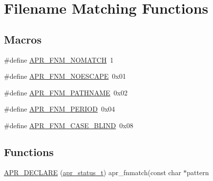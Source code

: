 \hypertarget{group__apr__fnmatch}{}\section{Filename Matching Functions}
\label{group__apr__fnmatch}
\subsection*{Macros}
\begin{DoxyCompactItemize}
\item 
\#define \mbox{\hyperlink{group__apr__fnmatch_gaea769621807400e4c741e7deddf6c3df}{A\+P\+R\+\_\+\+F\+N\+M\+\_\+\+N\+O\+M\+A\+T\+CH}}~1
\item 
\#define \mbox{\hyperlink{group__apr__fnmatch_gae12c1286631f316647be6dc007170630}{A\+P\+R\+\_\+\+F\+N\+M\+\_\+\+N\+O\+E\+S\+C\+A\+PE}}~0x01
\item 
\#define \mbox{\hyperlink{group__apr__fnmatch_ga0d421a2cef68cb590f958b5de6c7fe1b}{A\+P\+R\+\_\+\+F\+N\+M\+\_\+\+P\+A\+T\+H\+N\+A\+ME}}~0x02
\item 
\#define \mbox{\hyperlink{group__apr__fnmatch_ga4806f936b6eacc59dfed831d67b750ef}{A\+P\+R\+\_\+\+F\+N\+M\+\_\+\+P\+E\+R\+I\+OD}}~0x04
\item 
\#define \mbox{\hyperlink{group__apr__fnmatch_ga5cee1c0a917a283a193721d11160b502}{A\+P\+R\+\_\+\+F\+N\+M\+\_\+\+C\+A\+S\+E\+\_\+\+B\+L\+I\+ND}}~0x08
\end{DoxyCompactItemize}
\subsection*{Functions}
\begin{DoxyCompactItemize}
\item 
\mbox{\hyperlink{group__apr__fnmatch_gaaa224db42fb6857159b6b7049451ddea}{A\+P\+R\+\_\+\+D\+E\+C\+L\+A\+RE}} (\mbox{\hyperlink{group__apr__errno_gaf76ee4543247e9fb3f3546203e590a6c}{apr\+\_\+status\+\_\+t}}) apr\+\_\+fnmatch(const char $\ast$pattern
\end{DoxyCompactItemize}
